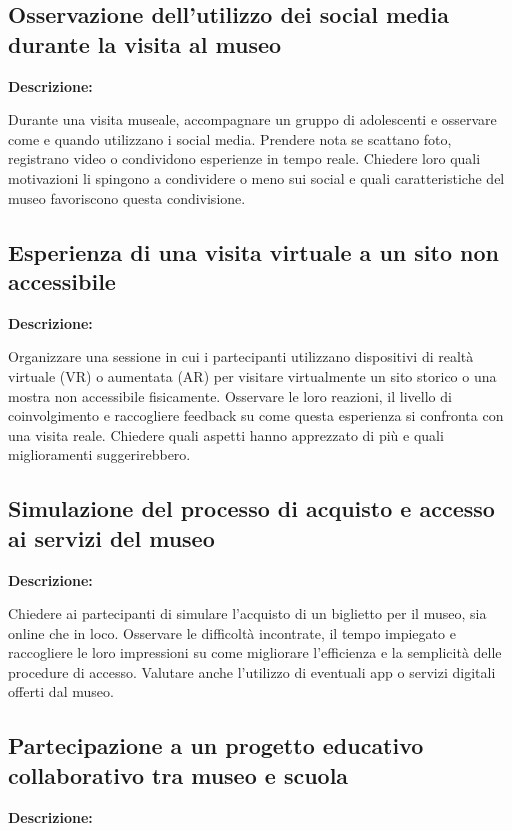 \documentclass{article}
\begin{document}
\subsection{Osservazione dell’utilizzo dei social media durante la visita al museo}

\textbf{Descrizione:}

Durante una visita museale, accompagnare un gruppo di adolescenti e osservare come e quando utilizzano i social media. Prendere nota se scattano foto, registrano video o condividono esperienze in tempo reale. Chiedere loro quali motivazioni li spingono a condividere o meno sui social e quali caratteristiche del museo favoriscono questa condivisione.

\subsection{Esperienza di una visita virtuale a un sito non accessibile}

\textbf{Descrizione:}

Organizzare una sessione in cui i partecipanti utilizzano dispositivi di realtà virtuale (VR) o aumentata (AR) per visitare virtualmente un sito storico o una mostra non accessibile fisicamente. Osservare le loro reazioni, il livello di coinvolgimento e raccogliere feedback su come questa esperienza si confronta con una visita reale. Chiedere quali aspetti hanno apprezzato di più e quali miglioramenti suggerirebbero.

\subsection{Simulazione del processo di acquisto e accesso ai servizi del museo}

\textbf{Descrizione:}

Chiedere ai partecipanti di simulare l’acquisto di un biglietto per il museo, sia online che in loco. Osservare le difficoltà incontrate, il tempo impiegato e raccogliere le loro impressioni su come migliorare l’efficienza e la semplicità delle procedure di accesso. Valutare anche l’utilizzo di eventuali app o servizi digitali offerti dal museo.

\subsection{Partecipazione a un progetto educativo collaborativo tra museo e scuola}

\textbf{Descrizione:}
\end{document}
